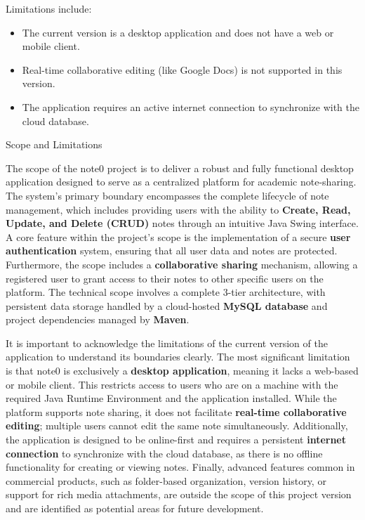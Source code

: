 \documentclass[12pt, a4paper]{report}
\begin{document}
Limitations include:
\begin{itemize}
    \item The current version is a desktop application and does not have a web or mobile client.
    \item Real-time collaborative editing (like Google Docs) is not supported in this version.
    \item The application requires an active internet connection to synchronize with the cloud database.
\end{itemize}

{Scope and Limitations}

The scope of the note0 project is to deliver a robust and fully functional desktop application designed to serve as a centralized platform for academic note-sharing. The system's primary boundary encompasses the complete lifecycle of note management, which includes providing users with the ability to \textbf{Create, Read, Update, and Delete (CRUD)} notes through an intuitive Java Swing interface. A core feature within the project's scope is the implementation of a secure \textbf{user authentication} system, ensuring that all user data and notes are protected. Furthermore, the scope includes a \textbf{collaborative sharing} mechanism, allowing a registered user to grant access to their notes to other specific users on the platform. The technical scope involves a complete 3-tier architecture, with persistent data storage handled by a cloud-hosted \textbf{MySQL database} and project dependencies managed by \textbf{Maven}.

It is important to acknowledge the limitations of the current version of the application to understand its boundaries clearly. The most significant limitation is that note0 is exclusively a \textbf{desktop application}, meaning it lacks a web-based or mobile client. This restricts access to users who are on a machine with the required Java Runtime Environment and the application installed. While the platform supports note sharing, it does not facilitate \textbf{real-time collaborative editing}; multiple users cannot edit the same note simultaneously. Additionally, the application is designed to be online-first and requires a persistent \textbf{internet connection} to synchronize with the cloud database, as there is no offline functionality for creating or viewing notes. Finally, advanced features common in commercial products, such as folder-based organization, version history, or support for rich media attachments, are outside the scope of this project version and are identified as potential areas for future development.
\end{document}

